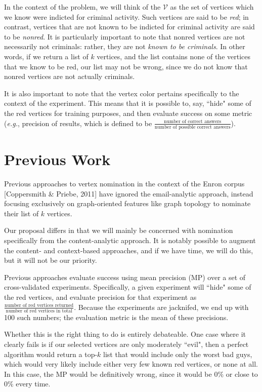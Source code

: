 \documentclass[11pt]{article}
\begin{document}
In the context of the problem, we will think of the $\mathcal{V}$ as the set of vertices which we know were indicted for criminal activity. Such vertices are said to be \textit{red}; in contrast, vertices that are not known to be indicted for criminal activity are said to be \textit{nonred}. It is particularly important to note that nonred vertices are not necessarily not criminals: rather, they are not \textit{known to be criminals}. In other words, if we return a list of $k$ vertices, and the list contains none of the vertices that we know to be red, our list may not be wrong, since we do not know that nonred vertices are not actually criminals.

It is also important to note that the vertex color pertains specifically to the context of the experiment. This means that it is possible to, say, ``hide" some of the red vertices for training purposes, and then evaluate success on some metric (\textit{e.g.}, precision of results, which is defined to be $\frac{\text{number of correct answers}}{\text{number of possible correct answers}}$).

\section{Previous Work}\label{ch:overview}
Previous approaches to vertex nomination in the context of the Enron corpus [Coppersmith \& Priebe, 2011] have ignored the email-analytic approach, instead focusing exclusively on graph-oriented features like graph topology to nominate their list of $k$ vertices.

Our proposal differs in that we will mainly be concerned with nomination specifically from the content-analytic approach. It is notably possible to augment the content- and context-based approaches, and if we have time, we will do this, but it will not be our priority.

Previous approaches evaluate success using mean precision (MP) over a set of cross-validated experiments. Specifically, a given experiment will ``hide" some of the red vertices, and evaluate precision for that experiment as $\frac{\text{number of red vertices returned}}{\text{number of red vertices in total}}$. Because the experiments are jacknifed, we end up with 100 such numbers; the evaluation metric is the mean of these precisions.

Whether this is the right thing to do is entirely debateable. One case where it clearly fails is if our selected vertices are only moderately ``evil", then a perfect algorithm would return a top-$k$ list that would include only the worst bad guys, which would very likely include either very few known red vertices, or none at all. In this case, the MP would be definitively wrong, since it would be $0\%$ or close to $0\%$ every time.
\end{document}
